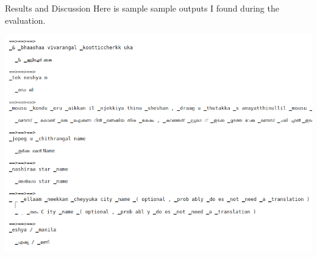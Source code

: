 \begin{chapter}{Results and Discussion}
Here is sample sample outputs I found during the evaluation.

\includegraphics[width=\linewidth]{Images/transliteration_output.png}

\end{chapter}